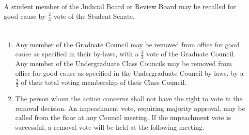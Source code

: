 \section{}
A student member of the Judicial Board or Review Board may be recalled for good cause by $\frac{2}{3}$ vote of the Student Senate.

\section{}
\begin{enumerate}
\item Any member of the Graduate Council may be removed from office for good cause as specified in
their by-laws, with a $\frac{2}{3}$ vote of the Graduate Council. Any member of the Undergraduate Class
Councils may be removed from office for good cause as specified in the Undergraduate Council
by-laws, by a $\frac{2}{3}$ of their total voting membership of their Class Council.
\item The person whom the action concerns shall not have the right to vote in the removal decision.
An impeachment vote, requiring majority approval, may be called from the floor at any Council
meeting. If the impeachment vote is successful, a removal vote will be held at the following
meeting. 
\end{enumerate}